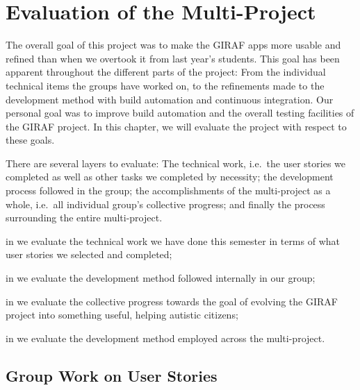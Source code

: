 \chapter{Evaluation of the Multi-Project}\label{chap:evaluation}
The overall goal of this project was to make the GIRAF apps more usable and refined than when we overtook it from last year's students. This goal has been apparent throughout the different parts of the project: From the individual technical items the groups have worked on, to the refinements made to the development method with build automation and continuous integration. Our personal goal was to improve build automation and the overall testing facilities of the GIRAF project. In this chapter, we will evaluate the project with respect to these goals.

There are several layers to evaluate: The technical work, i.e.\ the user stories we completed as well as other tasks we completed by necessity; the development process followed in the group; the accomplishments of the multi-project as a whole, i.e.\ all individual group's collective progress; and finally the process surrounding the entire multi-project. 

\begin{chapterorganization}
  \item in  we evaluate the technical work we have done this semester in terms of what user stories we selected and completed;
  \item in  we evaluate the development method followed internally in our group;
  \item in  we evaluate the collective progress towards the goal of evolving the GIRAF project into something useful, helping autistic citizens;
  \item in  we evaluate the development method employed across the multi-project.
\end{chapterorganization}

\section{Group Work on User Stories}\label{conc:userstories}

